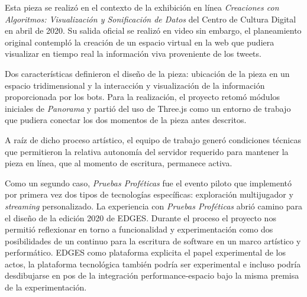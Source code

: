Esta pieza se realizó en el contexto de la exhibición en línea \textit{Creaciones con Algoritmos: Visualización y Sonificación de Datos} del Centro de Cultura Digital en abril de 2020. Su salida oficial se realizó en video sin embargo, el planeamiento original contempló la creación de un espacio virtual en la web que pudiera visualizar en tiempo real la información viva proveniente de los tweets.

Dos características definieron el diseño de la pieza: ubicación de la pieza en un espacio tridimensional y la interacción y visualización de la información proporcionada por los bots. Para la realización, el proyecto retomó módulos iniciales de \textit{Panorama} y partió del uso de Three.js como un entorno de trabajo que pudiera conectar los dos momentos de la pieza antes descritos. 

A raíz de dicho proceso artístico, el equipo de trabajo generó condiciones técnicas que permitieron la relativa autonomía del servidor requerido para mantener la pieza en línea, que al momento de escritura, permanece activa.






Como un segundo caso, \textit{Pruebas Proféticas} fue el evento piloto que implementó por primera vez dos tipos de tecnologías específicas: exploración multijugador y \textit{streaming} personalizado. La experiencia con \textit{Pruebas Proféticas} abrió camino para el diseño de la edición 2020 de EDGES. Durante el proceso el proyecto nos permitió reflexionar en torno a funcionalidad y experimentación como dos posibilidades de un continuo para la escritura de software en un marco artístico y performático. EDGES como plataforma explicita el papel experimental de los actos, la plataforma tecnológica también podría ser experimental e incluso podría desdibujarse en pos de la integración performance-espacio bajo la misma premisa de la experimentación.

